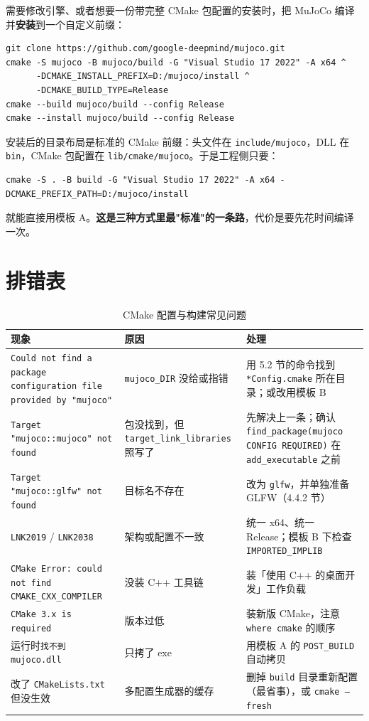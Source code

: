 需要修改引擎、或者想要一份带完整 CMake 包配置的安装时，把 MuJoCo 编译并\textbf{安装}到一个自定义前缀：

\begin{lstlisting}[style=shell]
git clone https://github.com/google-deepmind/mujoco.git
cmake -S mujoco -B mujoco/build -G "Visual Studio 17 2022" -A x64 ^
      -DCMAKE_INSTALL_PREFIX=D:/mujoco/install ^
      -DCMAKE_BUILD_TYPE=Release
cmake --build mujoco/build --config Release
cmake --install mujoco/build --config Release
\end{lstlisting}

安装后的目录布局是标准的 CMake 前缀：头文件在 \texttt{include/mujoco}，DLL 在 \texttt{bin}，CMake 包配置在 \texttt{lib/cmake/mujoco}。于是工程侧只要：

\begin{lstlisting}[style=shell]
cmake -S . -B build -G "Visual Studio 17 2022" -A x64 -DCMAKE_PREFIX_PATH=D:/mujoco/install
\end{lstlisting}

就能直接用模板 A。\textbf{这是三种方式里最"标准"的一条路}，代价是要先花时间编译一次。

\section{排错表}

\begin{table}[H]
	\centering
	\caption{CMake 配置与构建常见问题}
	\label{tab:CMake:排错}
	\footnotesize
	\begin{tabular}{>{\raggedright\arraybackslash}p{5.2cm}>{\raggedright\arraybackslash}p{4.0cm}>{\raggedright\arraybackslash}p{5.2cm}}
		\hline
		现象 & 原因 & 处理 \\
		\hline
		\texttt{Could not find a package configuration file provided by "mujoco"} & \texttt{mujoco\_DIR} 没给或指错 & 用 5.2 节的命令找到 \texttt{*Config.cmake} 所在目录；或改用模板 B \\
		\texttt{Target "mujoco::mujoco" not found} & 包没找到，但 \texttt{target\_link\_libraries} 照写了 & 先解决上一条；确认 \texttt{find\_package(mujoco CONFIG REQUIRED)} 在 \texttt{add\_executable} 之前 \\
		\texttt{Target "mujoco::glfw" not found} & 目标名不存在 & 改为 \texttt{glfw}，并单独准备 GLFW（4.4.2 节） \\
		\texttt{LNK2019} / \texttt{LNK2038} & 架构或配置不一致 & 统一 x64、统一 Release；模板 B 下检查 \texttt{IMPORTED\_IMPLIB} \\
		\texttt{CMake Error: could not find CMAKE\_CXX\_COMPILER} & 没装 C++ 工具链 & 装「使用 C++ 的桌面开发」工作负载 \\
		\texttt{CMake 3.x is required} & 版本过低 & 装新版 CMake，注意 \texttt{where cmake} 的顺序 \\
		运行时\texttt{找不到 mujoco.dll} & 只拷了 exe & 用模板 A 的 \texttt{POST\_BUILD} 自动拷贝 \\
		改了 \texttt{CMakeLists.txt} 但没生效 & 多配置生成器的缓存 & 删掉 \texttt{build} 目录重新配置（最省事），或 \texttt{cmake --fresh} \\
		\hline
	\end{tabular}
\end{table}

